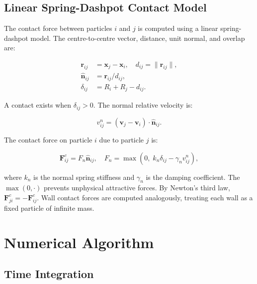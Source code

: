 \documentclass[conference]{IEEEtran}
\begin{document}
	\subsection{Linear Spring-Dashpot Contact Model}
	
	The contact force between particles $i$ and $j$ is computed using a linear
	spring-dashpot model. The centre-to-centre vector, distance, unit normal, and
	overlap are:
	
	\begin{align}
		\mathbf{r}_{ij} &= \mathbf{x}_j - \mathbf{x}_i, \quad
		d_{ij} = \|\mathbf{r}_{ij}\|, \\
		\hat{\mathbf{n}}_{ij} &= \mathbf{r}_{ij} / d_{ij}, \\
		\delta_{ij} &= R_i + R_j - d_{ij}.
	\end{align}
	
	A contact exists when $\delta_{ij} > 0$. The normal relative velocity is:
	
	\begin{equation}
		v^n_{ij} = (\mathbf{v}_j - \mathbf{v}_i) \cdot \hat{\mathbf{n}}_{ij}.
	\end{equation}
	
	The contact force on particle $i$ due to particle $j$ is:
	
	\begin{equation}
		\mathbf{F}^c_{ij} = F_n \hat{\mathbf{n}}_{ij},
		\quad
		F_n = \max\!\left(0,\; k_n \delta_{ij} - \gamma_n v^n_{ij}\right),
	\end{equation}
	
	where $k_n$ is the normal spring stiffness and $\gamma_n$ is the damping
	coefficient. The $\max(0, \cdot)$ prevents unphysical attractive forces.
	By Newton's third law, $\mathbf{F}^c_{ji} = -\mathbf{F}^c_{ij}$.
	Wall contact forces are computed analogously, treating each wall as a
	fixed particle of infinite mass.
	
	\section{Numerical Algorithm}
	\label{sec:algorithm}
	
	\subsection{Time Integration}
	
\end{document}
